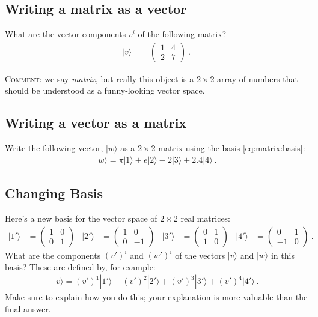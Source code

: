 \documentclass[12pt]{article}
\numberwithin{equation}{section}    %
\begin{document}
\subsection{Writing a matrix as a vector}

What are the vector components $v^i$ of the following matrix? 
\begin{align}
	|v\rangle& = 
		\begin{pmatrix}
			1 & 4\\
			2 & 7
		\end{pmatrix} \ .
\end{align}

{\small \textsc{Comment:} we say \emph{matrix}, but really this object is a $2\times 2$ array of numbers that should be understood as a funny-looking vector space.}

\subsection{Writing a vector as a matrix}

Write the following vector, $|w\rangle$ as a $2\times 2$ matrix using the basis \eqref{eq:matrix:basis}:
\begin{align}
	|w\rangle = \pi |1\rangle + e|2\rangle - 2 |3\rangle + 2.4|4\rangle \ .
\end{align}

\subsection{Changing Basis}

Here's a new basis for the vector space of $2\times 2$ real matrices:
\begin{align}
	|1'\rangle &= 
	\begin{pmatrix}
		1 & 0 \\ 0 & 1
	\end{pmatrix}
	&
	|2'\rangle &= 
	\begin{pmatrix}
		1 & 0 \\ 0 & -1
	\end{pmatrix}
	&
	|3'\rangle &= 
	\begin{pmatrix}
		0 & 1 \\ 1 & 0
	\end{pmatrix}
	&
	|4'\rangle &= 
	\begin{pmatrix}
		0 & 1 \\ -1 & 0
	\end{pmatrix} \ .
	\label{eq:matrix:basis:prime}
\end{align}
What are the components $(v')^i$ and $(w')^i$ of the vectors $|v\rangle$ and $|w\rangle$ in this basis? These are defined by, for example:
\begin{align}
	|v\rangle = (v')^1|1'\rangle + (v')^2|2'\rangle + (v')^3|3'\rangle + (v')^4|4'\rangle \ .
\end{align}
Make sure to explain how you do this; your explanation is more valuable than the final answer. 
\end{document}
